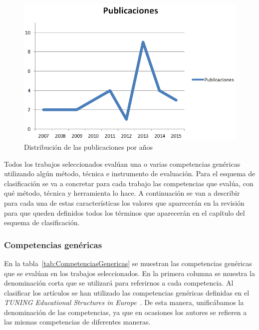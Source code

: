 \begin{figure}
  \begin{center}
    \includegraphics[scale=0.4]{PublicacionesAnuales.png}
  \end{center}
  \caption{Distribución de las publicaciones por años}
  \label{fig:PublicacionesAnuales}
\end{figure}



Todos los trabajos seleccionados evalúan una o varias competencias genéricas utilizando algún método, técnica e instrumento de evaluación. Para el esquema de clasificación se va a concretar para cada trabajo las competencias que evalúa, con qué método, técnica y herramienta lo hace. A continuación se van a describir para cada una de estas características los valores que aparecerán en la revisión para que queden definidos todos los términos que aparecerán en el capítulo del esquema de clasificación.

\subsubsection{Competencias genéricas}

En la tabla~\ref{tab:CompetenciasGenericas} se muestran las competencias genéricas que se evalúan en los trabajos seleccionados. En la primera columna se muestra la denominación corta que se utilizará para referirnos a cada competencia. Al clasificar los artículos se han utilizado las competencias genéricas definidas en el \emph{TUNING Educational Structures in Europe}~\cite{gonzalez2003tuning}. De esta manera, unificábamos la denominación de las competencias, ya que en ocasiones los autores se refieren a las mismas competencias de diferentes maneras.

